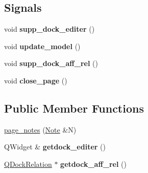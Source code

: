 \subsection*{Signals}
\begin{DoxyCompactItemize}
\item 
\mbox{\label{classpage__notes_a5b8f0db068908857d83afa630b8e4a86}} 
void {\bfseries supp\+\_\+dock\+\_\+editer} ()
\item 
\mbox{\label{classpage__notes_ab0e939533b6d2ceea5c94d7c4739e0cb}} 
void {\bfseries update\+\_\+model} ()
\item 
\mbox{\label{classpage__notes_ac0ee46fc4c828960556fff31762fcffa}} 
void {\bfseries supp\+\_\+dock\+\_\+aff\+\_\+rel} ()
\item 
\mbox{\label{classpage__notes_a53cde94ca69c6d560578b53560e72170}} 
void {\bfseries close\+\_\+page} ()
\end{DoxyCompactItemize}
\subsection*{Public Member Functions}
\begin{DoxyCompactItemize}
\item 
\hyperlink{classpage__notes_ad9a1b3dbe6c7901ed37a5784b1094fa6}{page\+\_\+notes} (\hyperlink{class_note}{Note} \&N)
\item 
\mbox{\label{classpage__notes_ab2beff1e0ece138a3a7e1419bfa8fbde}} 
Q\+Widget \& {\bfseries getdock\+\_\+editer} ()
\item 
\mbox{\label{classpage__notes_a6516f7d84e5a7f9cb06d733aa4a02697}} 
\hyperlink{class_q_dock_relation}{Q\+Dock\+Relation} $\ast$ {\bfseries getdock\+\_\+aff\+\_\+rel} ()
\end{DoxyCompactItemize}
